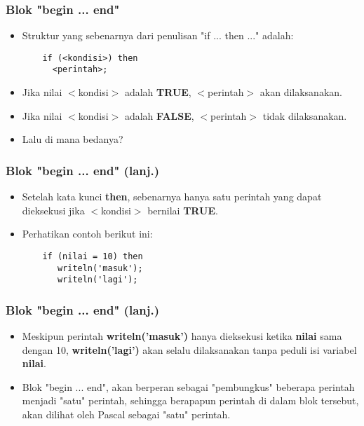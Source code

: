 \documentclass{beamer}
\begin{document}
\begin{frame}[fragile]
\frametitle{Blok "begin ... end"}
\begin{itemize}
  \item Struktur yang sebenarnya dari penulisan "if ... then ..." adalah:
  \begin{lstlisting}
    if (<kondisi>) then
      <perintah>;
  \end{lstlisting}
  \item Jika nilai $<$kondisi$>$ adalah \textbf{TRUE}, $<$perintah$>$ akan dilaksanakan.
  \item Jika nilai $<$kondisi$>$ adalah \textbf{FALSE}, $<$perintah$>$ tidak dilaksanakan.
  \item Lalu di mana bedanya?
\end{itemize}
\end{frame}

\begin{frame}[fragile]
\frametitle{Blok "begin ... end" (lanj.)}
\begin{itemize}
  \item Setelah kata kunci \textbf{then}, sebenarnya hanya \alert{satu} perintah yang dapat dieksekusi jika $<$kondisi$>$ bernilai \textbf{TRUE}.
  \item Perhatikan contoh berikut ini:
  \begin{lstlisting}
    if (nilai = 10) then
       writeln('masuk');
       writeln('lagi');
  \end{lstlisting}
\end{itemize}
\end{frame}

\begin{frame}[fragile]
\frametitle{Blok "begin ... end" (lanj.)}
\begin{itemize}
  \item Meskipun perintah \textbf{writeln('masuk')} hanya dieksekusi ketika \textbf{nilai} sama dengan 10, \textbf{writeln('lagi')} akan \alert{selalu dilaksanakan} tanpa peduli isi variabel \textbf{nilai}.
  \item Blok "begin ... end", akan berperan sebagai "pembungkus" beberapa perintah menjadi "satu" perintah, sehingga berapapun perintah di dalam blok tersebut, akan dilihat oleh Pascal sebagai "satu" perintah.
\end{itemize}
\end{frame}
\end{document}
